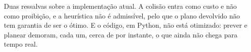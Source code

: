 Duas ressalvas sobre a implementação atual. A colisão entra como custo e
não como proibição, e a heurística não é admissível, pelo que o plano
devolvido não tem garantia de ser o ótimo. E o código, em Python, não
está otimizado: prever e planear demoram, cada um, cerca de 
por instante, o que ainda não chega para tempo real.
